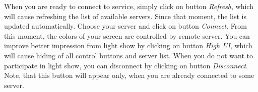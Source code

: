 When you are ready to connect to service, simply click on button \emph{Refresh}, which will cause refreshing the list of available servers. 
Since that moment, the list is updated automatically.
Choose your server and click on button \emph{Connect}.
From this moment, the colors of your screen are controlled by remote server.
You can improve better impression from light show by clicking on button \emph{High UI}, which will cause hiding of all control buttons and server list.
When you do not want to participate in light show, you can disconnect by clicking on button \emph{Disconnect}.
Note, that this button will appear only, when you are already connected to some server.
